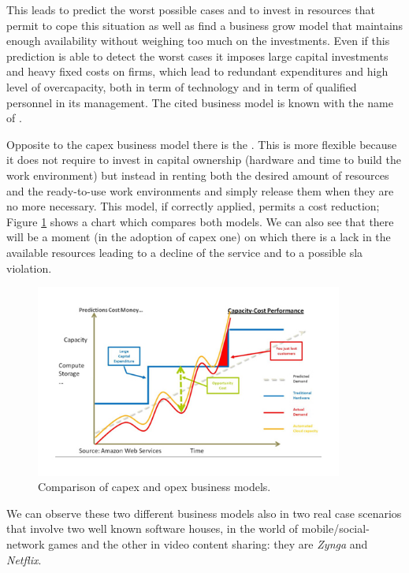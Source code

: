This leads to predict the worst possible cases and to invest in resources that permit to cope this
situation as well as find a business grow model that maintains enough availability without weighing
too much on the investments. Even if this prediction is able to detect the worst cases it imposes
large capital investments and heavy fixed costs on firms, which lead to redundant expenditures and
high level of overcapacity, both in term of technology and in term of qualified personnel in its
management. The cited business model is known with the name of .

Opposite to the \ac{capex} business model there is the . This is more flexible
because it does not require to invest in capital ownership (hardware and time to build the work
environment) but instead in renting both the desired amount of resources and the ready-to-use work
environments and simply release them when they are no more necessary. This model, if correctly applied,
permits a cost reduction; Figure \ref{img:problemSpace-capexOpex-model} shows a chart which compares
both models. We can also see that there will be a moment (in the adoption of \ac{capex} one) on which
there is a lack in the available resources leading to a decline of the service and to a possible \ac{sla}
violation.

\begin{figure}
	\centering{}
	\includegraphics[width=0.9\textwidth]{chapters/problem/images/capex-opex.png}
	\caption[Comparison between \acs{capex} and \acs{opex} business models]{Comparison of \acf{capex}
		and \acf{opex} business models.}
	\label{img:problemSpace-capexOpex-model}
\end{figure}

We can observe these two different business models also in two real case scenarios \cite{netflixZynga}
that involve two well known software houses, in the world of mobile/social-network games and the other
in video content sharing: they are \textit{Zynga} and \textit{Netflix}. 

